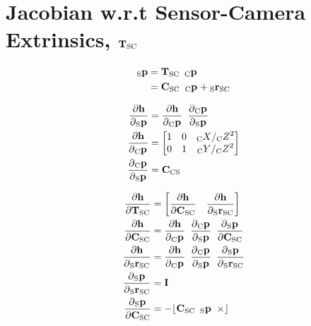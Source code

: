 \section{Jacobian w.r.t Sensor-Camera Extrinsics, $\Tf{\sensor}{\cam}$}

\begin{align}
  \Point{\sensor}{\fiducial_{ij}}
  &=
    \Tf{\sensor}{\cam}
    \enspace \Pt{\cam} \\
  &=
    \Rot{\sensor}{\cam}
    \enspace \Pt{\cam}
		+ \Pos{\sensor}{\cam}
\end{align}

\begin{align}
  \dfrac{\partial{\projFunc}}{\partial{\Pt{\sensor}}}
		&=
			\dfrac{\partial{\projFunc}}{\partial{\Pt{\cam}}}
			\enspace
			\dfrac{\partial{\Pt{\cam}}}{\partial{\Pt{\sensor}}} \\
  \dfrac{\partial{\projFunc}}{\partial{\Pt{\cam}}}
		&=
			\begin{bmatrix}
				1 & 0 & \KineNotationBare{X}{\cam} / \KineNotationBare{Z}{\cam}^{2} \\
				0 & 1 & \KineNotationBare{Y}{\cam} / \KineNotationBare{Z}{\cam}^{2}
			\end{bmatrix} \\
  \dfrac{\partial{\Pt{\cam}}}{\partial{\Pt{\sensor}}}
		&= \Rot{\cam}{\sensor}
\end{align}


\begin{align}
  \dfrac{\partial{\projFunc}}{\partial{\Tf{\sensor}{\cam}}}
    &=
			\begin{bmatrix}
				\dfrac{\partial{\projFunc}}{\partial{\Rot{\sensor}{\cam}}}
				\quad
				\dfrac{\partial{\projFunc}}{\partial{\Pos{\sensor}{\cam}}}
			\end{bmatrix} \\
  \dfrac{\partial{\projFunc}}{\partial{\Rot{\sensor}{\cam}}}
    &=
      \dfrac{\partial{\projFunc}}{\partial{\Pt{\cam}}}
			\enspace
      \dfrac{\partial{\Pt{\cam}}}{\partial{\Pt{\sensor}}}
			\enspace
      \dfrac{\partial{\Pt{\sensor}}}{\partial{\Rot{\sensor}{\cam}}} \\
  \dfrac{\partial{\projFunc}}{\partial{\Pos{\sensor}{\cam}}}
    &=
      \dfrac{\partial{\projFunc}}{\partial{\Pt{\cam}}}
			\enspace
      \dfrac{\partial{\Pt{\cam}}}{\partial{\Pt{\sensor}}}
			\enspace
      \dfrac{\partial{\Pt{\sensor}}}{\partial{\Pos{\sensor}{\cam}}} \\
	\dfrac{\partial{\Pt{\sensor}}}{\partial{\Pos{\sensor}{\cam}}}
	  &= \I \\
	\dfrac{\partial{\Pt{\sensor}}}{\partial{\Rot{\sensor}{\cam}}}
    &= -\Skew{\Rot{\sensor}{\cam} \enspace \Pt{\sensor}}
\end{align}


